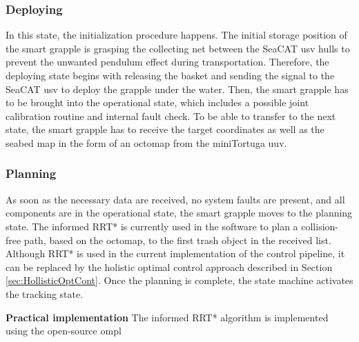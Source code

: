 \subsubsection{Deploying}
In this state, the initialization procedure happens. The initial storage position of the smart grapple is grasping the collecting net between the SeaCAT \gls{usv} hulls to prevent the unwanted pendulum effect during transportation. Therefore, the deploying state begins with releasing the basket and sending the signal to the SeaCAT \gls{usv} to deploy the grapple under the water. Then, the smart grapple has to be brought into the operational state, which includes a possible joint calibration routine and internal fault check. To be able to transfer to the next state, the smart grapple has to receive the target coordinates as well as the seabed map in the form of an \gls{octomap} \cite{OctomapArticle} from the miniTortuga \gls{uuv}.  
\subsubsection{Planning}
\label{sec:planningState}
As soon as the necessary data are received, no system faults are present, and all components are in the operational state, the smart grapple moves to the planning state. The informed \gls{RRT*} \cite{RRTstarArticle} is currently used in the software to plan a collision-free path, based on the \gls{octomap}, to the first trash object in the received list. Although \gls{RRT*} is used in the current implementation of the control pipeline, it can be replaced by the holistic optimal control approach described in Section \ref{sec:HollisticOptCont}. Once the planning is complete, the state machine activates the tracking state. 

\textbf{Practical implementation} The informed \gls{RRT*} algorithm is implemented using the open-source \gls{ompl} \cite{sucan2012the-open-motion-planning-library}

